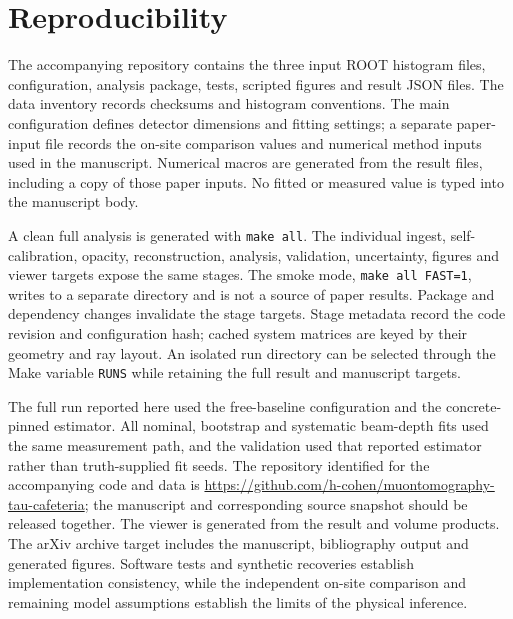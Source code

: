 \section{Reproducibility}\label{sec:reproducibility}
The accompanying repository contains the three input ROOT histogram files, configuration, analysis package, tests, scripted figures and result JSON files. The data inventory records checksums and histogram conventions. The main configuration defines detector dimensions and fitting settings; a separate paper-input file records the on-site comparison values and numerical method inputs used in the manuscript. Numerical macros are generated from the result files, including a copy of those paper inputs. No fitted or measured value is typed into the manuscript body.

A clean full analysis is generated with \texttt{make all}. The individual ingest, self-calibration, opacity, reconstruction, analysis, validation, uncertainty, figures and viewer targets expose the same stages. The smoke mode, \texttt{make all FAST=1}, writes to a separate directory and is not a source of paper results. Package and dependency changes invalidate the stage targets. Stage metadata record the code revision and configuration hash; cached system matrices are keyed by their geometry and ray layout. An isolated run directory can be selected through the Make variable \texttt{RUNS} while retaining the full result and manuscript targets.

The full run reported here used the free-baseline configuration and the concrete-pinned estimator. All nominal, bootstrap and systematic beam-depth fits used the same measurement path, and the validation used that reported estimator rather than truth-supplied fit seeds. The repository identified for the accompanying code and data is \url{https://github.com/h-cohen/muontomography-tau-cafeteria}; the manuscript and corresponding source snapshot should be released together. The viewer is generated from the result and volume products. The arXiv archive target includes the manuscript, bibliography output and generated figures. Software tests and synthetic recoveries establish implementation consistency, while the independent on-site comparison and remaining model assumptions establish the limits of the physical inference.
